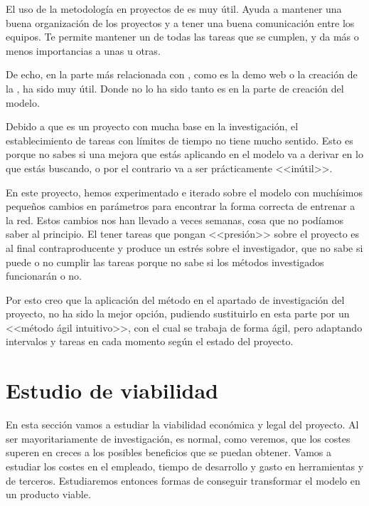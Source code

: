 El uso de la metodología  en proyectos de  es muy útil. Ayuda a mantener una buena organización de los proyectos y a tener una buena comunicación entre los equipos. Te permite mantener un  de todas las tareas que se cumplen, y da más o menos importancias a unas u otras.

De echo, en la parte más relacionada con , como es la demo web o la creación de la , ha sido muy útil. Donde no lo ha sido tanto es en la parte de creación del modelo.

Debido a que es un proyecto con mucha base en la investigación, el establecimiento de tareas con límites de tiempo no tiene mucho sentido. Esto es porque no sabes si una mejora que estás aplicando en el modelo va a derivar en lo que estás buscando, o por el contrario va a ser prácticamente <<inútil>>.

En este proyecto, hemos experimentado e iterado sobre el modelo con muchísimos pequeños cambios en parámetros para encontrar la forma correcta de entrenar a la red. Estos cambios nos han llevado a veces semanas, cosa que no podíamos saber al principio. El tener tareas que pongan <<presión>> sobre el proyecto es al final contraproducente y produce un estrés sobre el investigador, que no sabe si puede o no cumplir las tareas porque no sabe si los métodos investigados funcionarán o no.

Por esto creo que la aplicación del método  en el apartado de investigación del proyecto, no ha sido la mejor opción, pudiendo sustituirlo en esta parte por un <<método ágil intuitivo>>, con el cual se trabaja de forma ágil, pero adaptando intervalos y tareas en cada momento según el estado del proyecto.


\section{Estudio de viabilidad}

En esta sección vamos a estudiar la viabilidad económica y legal del proyecto. Al ser mayoritariamente de investigación, es normal, como veremos, que los costes superen en creces a los posibles beneficios que se puedan obtener. Vamos a estudiar los costes en el  empleado, tiempo de desarrollo y gasto en herramientas y  de terceros. Estudiaremos entonces formas de conseguir transformar el modelo en un producto viable.

